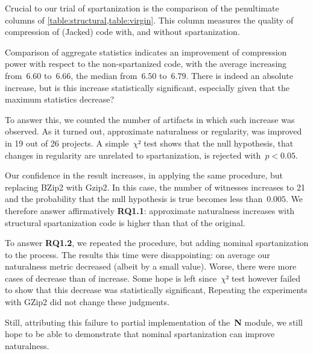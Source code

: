 Crucial to our trial of spartanization is the comparison of the penultimate
columns of \cref{table:structural,table:virgin}.
This column measures the quality of compression of (Jacked) code
with, and without spartanization.

Comparison of aggregate statistics indicates an improvement of compression
power with respect to the non-spartanized code, with the average increasing
from~$6.60$ to~$6.66$, the median from~$6.50$ to~$6.79$. There is indeed an
absolute increase, but is this increase statistically significant, especially
given that the maximum statistics decrease?

To answer this, we counted the number of artifacts in which such increase was
observed. As it turned out, approximate naturalness or regularity, was improved
in 19 out of 26 projects. A simple~$χ²$ test shows that the null hypothesis,
that changes in regularity are unrelated to spartanization, is rejected
with~$p < 0.05$.

Our confidence in the result increases, in applying the same procedure, but
replacing BZip2 with Gzip2. In this case, the number of witnesses increases to
21 and the probability that the null hypothesis is true becomes less
than~$0.005$. We therefore answer affirmatively \textbf{RQ1.1}: approximate
naturalness increases with structural spartanization code is higher than that
of the original.

To answer \textbf{RQ1.2}, we repeated the procedure, but adding nominal
spartanization to the process. The results this time were disappointing:
on average our naturalness metric decreased (albeit by a small value).
Worse, there were more cases of decrease than of increase. Some hope is left
since~$χ²$ test however failed to show that this decrease was statistically
significant, Repeating the experiments with GZip2 did not change these
judgments.

Still, attributing this failure to partial implementation of the~\textbf{N}
module, we still hope to be able to demonstrate that nominal spartanization can
improve naturalness.
\endinput

The first column of \cref{table:comparisons-original} refers to the application
of the Jack algorithm to the spartanized code. As we can see some of these
values are negative - particularly average, max value and range.  A negative
value for the average of the Jack compression powers implies that, on average,
spartanized code is less prone to be compressed by Jack the original code.
Negative values for max compression and range, that are of course related values, means
that there is a significant difference, for some projects, in the degree of compression
that Jack might achieved on spartanized code.

